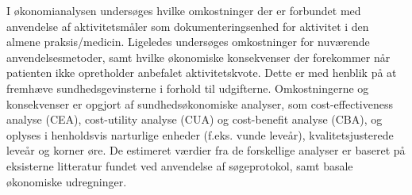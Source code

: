 I økonomianalysen undersøges hvilke omkostninger der er forbundet med anvendelse af aktivitetsmåler som dokumenteringsenhed for aktivitet i den almene praksis/medicin.
Ligeledes undersøges omkostninger for nuværende anvendelsesmetoder, samt hvilke økonomiske konsekvenser der forekommer når patienten ikke opretholder anbefalet aktivitetskvote.
Dette er med henblik på at fremhæve sundhedsgevinsterne i forhold til udgifterne.   
Omkostningerne og konsekvenser er opgjort af sundhedsøkonomiske analyser, som cost-effectiveness analyse (CEA), cost-utility analyse (CUA) og cost-benefit analyse (CBA), og oplyses i henholdsvis narturlige enheder (f.eks. vunde leveår), kvalitetsjusterede leveår og korner øre. 
De estimeret værdier fra de forskellige analyser er baseret på eksisterne litteratur fundet ved anvendelse af søgeprotokol, samt basale økonomiske udregninger.    

 



